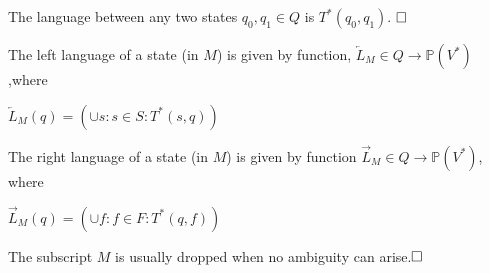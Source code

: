 \begin{definition} 
	The language between any two states $q_0,q_1\in Q$ is $T^\ast(q_0,q_1)$. $\hfill\square$
\end{definition}

\begin{definition}
	The left language of a state (in $M$) is given by function, $\overleftarrow{L}_M\in Q\to\mathbb{P}(V^\ast)$,where
	
	$\overleftarrow{L}_M(q)=(\cup s:s\in S:T^\ast(s,q))$
	
	The right language of a state (in $M$) is given by function $\overrightarrow{L}_M\in Q\to\mathbb{P}(V^\ast)$, where
	
	$\overrightarrow{L}_M(q)=(\cup f:f\in F:T^\ast(q,f))$
	
	The subscript $M$ is usually dropped when no ambiguity can arise.$\hfill\square$
\end{definition}

